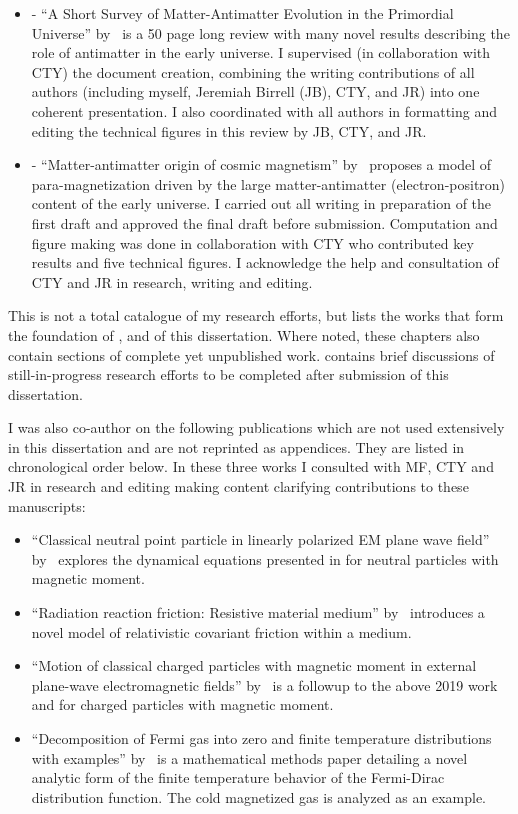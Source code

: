 \begin{itemize}
    \item {} - ``A Short Survey of Matter-Antimatter Evolution in the Primordial Universe'' by~\citet*{Rafelski:2023emw} is a 50 page long review with many novel results describing the role of antimatter in the early universe. I supervised (in collaboration with CTY) the document creation, combining the writing contributions of all authors (including myself, Jeremiah Birrell (JB), CTY, and JR) into one coherent presentation. I also coordinated with all authors in formatting and editing the technical figures in this review by JB, CTY, and JR.
    \item {} - ``Matter-antimatter origin of cosmic magnetism'' by~\citet*{Steinmetz:2023nsc} proposes a model of para-magnetization driven by the large matter-antimatter (electron-positron) content of the early universe. I carried out all writing in preparation of the first draft and approved the final draft before submission. Computation and figure making was done in collaboration with CTY who contributed key results and five technical figures. I acknowledge the help and consultation of CTY and JR in research, writing and editing.
\end{itemize}

This is not a total catalogue of my research efforts, but lists the works that form the foundation of ,  and  of this dissertation. Where noted, these chapters also contain sections of complete yet unpublished work.  contains brief discussions of still-in-progress research efforts to be completed after submission of this dissertation.

I was also co-author on the following publications which are not used extensively in this dissertation and are not reprinted as appendices. They are listed in chronological order below. In these three works I consulted with MF, CTY and JR in research and editing making content clarifying contributions to these manuscripts:
\begin{itemize}
    \item ``Classical neutral point particle in linearly polarized EM plane wave field'' by~\citet*{Formanek:2019cga} explores the dynamical equations presented in  for neutral particles with magnetic moment.
    \item ``Radiation reaction friction: Resistive material medium'' by~\citet*{Formanek:2020zwc} introduces a novel model of relativistic covariant friction within a medium.
    \item ``Motion of classical charged particles with magnetic moment in external plane-wave electromagnetic fields'' by~\citet*{Formanek:2021mcp} is a followup to the above 2019 work and  for charged particles with magnetic moment.
    \item ``Decomposition of Fermi gas into zero and finite temperature distributions with examples'' by~\citet*{Yang:2023aaa} is a mathematical methods paper detailing a novel analytic form of the finite temperature behavior of the Fermi-Dirac distribution function. The cold magnetized gas is analyzed as an example.
\end{itemize}

